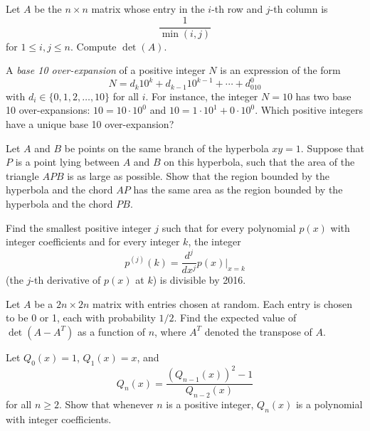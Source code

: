 \documentclass[12pt]{article}
\begin{document}
    \begin{exercise}[2014 A2]
        Let $A$ be the $n \times n$ matrix whose entry in the $i$-th row and $j$-th column is
        \[\frac{1}{\min(i, j)}
        \]
        for $1 \leq i, j \leq n$. Compute $\det(A)$.
    \end{exercise}

    \begin{exercise}[2014 B1]
        A {\it base 10 over-expansion} of a positive integer \(N\) is an expression of the form
        \[N = d_k10^k+d_{k-1}10^{k-1}+\cdots+d_010^0\]
        with \(d_i\in\{0,1,2,\ldots,10\}\) for all \(i\).
        For instance, the integer \(N=10\) has two base 10 over-expansions: \(10=10\cdot 10^0\) and \(10=1\cdot 10^1+0\cdot 10^0\).
        Which positive integers have a unique base 10 over-expansion?
    \end{exercise}

    \begin{exercise}[2015 A1]
        Let $A$ and $B$ be points on the same branch of the hyperbola $xy = 1$. Suppose that $P$ is a point lying between $A$ and $B$ on this hyperbola, such that the area of the triangle $APB$ is as large as possible. Show that the region bounded by the hyperbola and the chord $AP$ has the same area as the region bounded by the hyperbola and the chord $PB$.
    \end{exercise}

    \begin{exercise}[2016 A1]
        Find the smallest positive integer $j$ such that for every polynomial $p(x)$ with integer coefficients and for every integer $k$, the integer
        \[p^{(j)}(k) = \frac{d^j}{dx^j}p(x)\bigg|_{x=k}\] (the $j$-th derivative of $p(x)$ at $k$) is divisible by 2016.
    \end{exercise}

    \begin{exercise}[2016 B4]
        Let \(A\) be a \(2n\times 2n\) matrix with entries chosen at random.
        Each entry is chosen to be 0 or 1, each with probability \(1/2\).
        Find the expected value of \(\det(A-A^T)\) as a function of \(n\), where \(A^T\) denoted the transpose of \(A\).
    \end{exercise}

    \begin{exercise}[2017 A2]
        Let \(Q_0(x)=1\), \(Q_1(x)=x\), and
        \[Q_n(x)=\frac{(Q_{n-1}(x))^2-1}{Q_{n-2}(x)}\]
        for all \(n\geq 2\). Show that whenever \(n\) is a positive integer, \(Q_n(x)\) is a polynomial with integer coefficients.
    \end{exercise}
\end{document}
